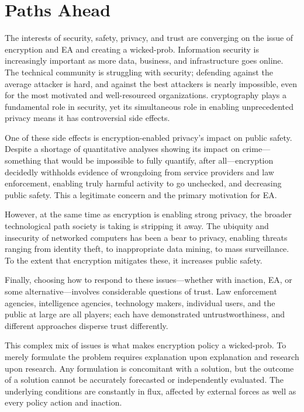\chapter{Paths Ahead}
\label{chap-pathsahead}

The interests of security, safety, privacy, and trust are converging on the issue of encryption and \acl{EA} and
creating a \ac{wicked-prob}. Information security is increasingly important as more data, business, and infrastructure
goes online. The technical community is struggling with security; defending against the average attacker is hard, and
against the best attackers is nearly impossible, even for the most motivated and well-resourced organizations.
\Ac{cryptography} plays a fundamental role in security, yet its simultaneous role in enabling unprecedented privacy
means it has controversial side effects.

One of these side effects is encryption-enabled privacy's impact on public safety. Despite a shortage of quantitative
analyses showing its impact on crime---something that would be impossible to fully quantify, after all---encryption
decidedly withholds evidence of wrongdoing from service providers and law enforcement, enabling truly harmful activity
to go unchecked, and decreasing public safety. This a legitimate concern and the primary motivation for \ac{EA}.

However, at the same time as encryption is enabling strong privacy, the broader technological path society is taking is
stripping it away. The ubiquity and insecurity of networked computers has been a bear to privacy, enabling threats
ranging from identity theft, to inappropriate data mining, to mass surveillance. To the extent that encryption mitigates
these, it increases public safety.

Finally, choosing how to respond to these issues---whether with inaction, \ac{EA}, or some alternative---involves
considerable questions of trust. Law enforcement agencies, intelligence agencies, technology makers, individual users,
and the public at large are all players; each have demonstrated untrustworthiness, and different approaches disperse
trust differently.


This complex mix of issues is what makes encryption policy a \ac{wicked-prob}. To merely formulate the problem requires
explanation upon explanation and research upon research. Any formulation is concomitant with a solution, but the outcome
of a solution cannot be accurately forecasted or independently evaluated. The underlying conditions are constantly in
flux, affected by external forces as well as every policy action and inaction.

